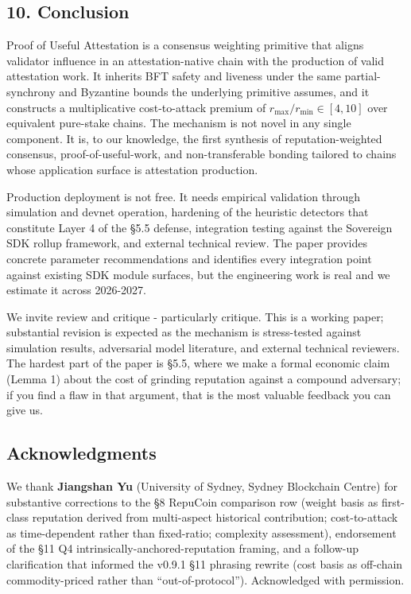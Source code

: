 \documentclass[
  11pt,
]{article}
\begin{document}
\subsection{10. Conclusion}\label{conclusion}

Proof of Useful Attestation is a consensus weighting primitive that
aligns validator influence in an attestation-native chain with the
production of valid attestation work. It inherits BFT safety and
liveness under the same partial-synchrony and Byzantine bounds the
underlying primitive assumes, and it constructs a multiplicative
cost-to-attack premium of \(r_{\max}/r_{\min} \in [4, 10]\) over
equivalent pure-stake chains. The mechanism is not novel in any single
component. It is, to our knowledge, the first synthesis of
reputation-weighted consensus, proof-of-useful-work, and
non-transferable bonding tailored to chains whose application surface is
attestation production.

Production deployment is not free. It needs empirical validation through
simulation and devnet operation, hardening of the heuristic detectors
that constitute Layer 4 of the §5.5 defense, integration testing against
the Sovereign SDK rollup framework, and external technical review. The
paper provides concrete parameter recommendations and identifies every
integration point against existing SDK module surfaces, but the
engineering work is real and we estimate it across 2026-2027.

We invite review and critique - particularly critique. This is a working
paper; substantial revision is expected as the mechanism is
stress-tested against simulation results, adversarial model literature,
and external technical reviewers. The hardest part of the paper is §5.5,
where we make a formal economic claim (Lemma 1) about the cost of
grinding reputation against a compound adversary; if you find a flaw in
that argument, that is the most valuable feedback you can give us.

\subsection{Acknowledgments}\label{acknowledgments}

We thank \textbf{Jiangshan Yu} (University of Sydney, Sydney Blockchain
Centre) for substantive corrections to the §8 RepuCoin comparison row
(weight basis as first-class reputation derived from multi-aspect
historical contribution; cost-to-attack as time-dependent rather than
fixed-ratio; complexity assessment), endorsement of the §11 Q4
intrinsically-anchored-reputation framing, and a follow-up clarification
that informed the v0.9.1 §11 phrasing rewrite (cost basis as off-chain
commodity-priced rather than ``out-of-protocol''). Acknowledged with
permission.
\end{document}
